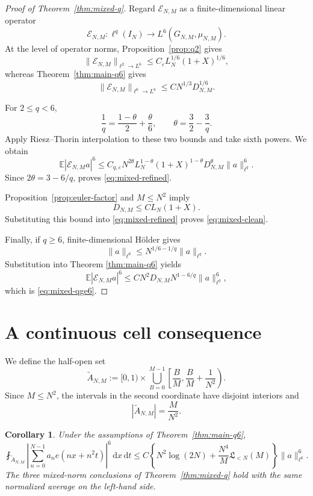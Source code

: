 \documentclass[11pt, twoside]{article}
\numberwithin{equation}{section}
\newtheorem{corollary}[theorem]{Corollary}
\theoremstyle{definition}
\newcommand{\E}{\mathbb E}
\newcommand{\cE}{\mathcal E}
\newcommand{\dd}{\,\mathrm d}
\newcommand{\Lcal}{\mathfrak L}
\begin{document}
\begin{proof}[Proof of Theorem~\ref{thm:mixed-q}]
Regard $\cE_{N,M}$ as a finite-dimensional linear operator
$$
\cE_{N,M}:\ell^q(I_N)\longrightarrow L^6(G_{N,M},\mu_{N,M}).
$$
At the level of operator norms, Proposition~\ref{prop:q2} gives
$$
\|\cE_{N,M}\|_{\ell^2\to L^6}
\leq C_\varepsilon L_N^{1/6}(1+X)^{1/6},
$$
whereas Theorem~\ref{thm:main-q6} gives
$$
\|\cE_{N,M}\|_{\ell^6\to L^6}
\leq CN^{1/3}D_{N,M}^{1/6}.
$$

For $2\leq q<6$,
$$
\frac1q=\frac{1-\theta}{2}+\frac{\theta}{6},
\qquad
\theta=\frac32-\frac3q.
$$
Apply Riesz--Thorin interpolation to these two bounds and take sixth powers.
We obtain
$$
\E|\cE_{N,M}a|^6\leq C_{q,\varepsilon}N^{2\theta}L_N^{1-\theta}(1+X)^{1-\theta}
D_{N,M}^{\theta}\|a\|_{\ell^q}^6.
$$
Since $2\theta=3-6/q$, proves \eqref{eq:mixed-refined}.

Proposition~\ref{prop:euler-factor} and $M\leq N^2$ imply
$$
D_{N,M}\leq CL_N(1+X).
$$
Substituting this bound into \eqref{eq:mixed-refined} proves \eqref{eq:mixed-clean}.

Finally, if $q\geq6$, finite-dimensional H\"older gives
$$
\|a\|_{\ell^6}\leq N^{1/6-1/q}\|a\|_{\ell^q}.
$$
Substitution into Theorem \ref{thm:main-q6} yields
$$
\E|\cE_{N,M}a|^6
\leq CN^2D_{N,M}N^{1-6/q}\|a\|_{\ell^q}^6,
$$
which is \eqref{eq:mixed-qge6}.
\end{proof}

\section{A continuous cell consequence}\label{sec:continuous}

We define the half-open set
$$
\widetilde A_{N,M}
:=
[0,1)\times
\bigcup_{B=0}^{M-1}
\left[\frac BM,\frac BM+\frac1{N^2}\right).
$$
Since $M\leq N^2$, the intervals in the second coordinate have disjoint
interiors and
$$
\left|\widetilde A_{N,M}\right|=\frac{M}{N^2}.
$$

\begin{corollary}\label{cor:cells}
Under the assumptions of Theorem~\ref{thm:main-q6},
$$
\fint_{\widetilde A_{N,M}}
\left|\sum_{n=0}^{N-1}a_ne(nx+n^2t)\right|^6\dd x\dd t
\leq
C\left\{N^2\log(2N)+\frac{N^4}{M}\Lcal_{<N}(M)\right\}
\|a\|_{\ell^6}^6.
$$
The three mixed-norm conclusions of Theorem~\ref{thm:mixed-q} hold with the
same normalized average on the left-hand side.
\end{corollary}
\end{document}

